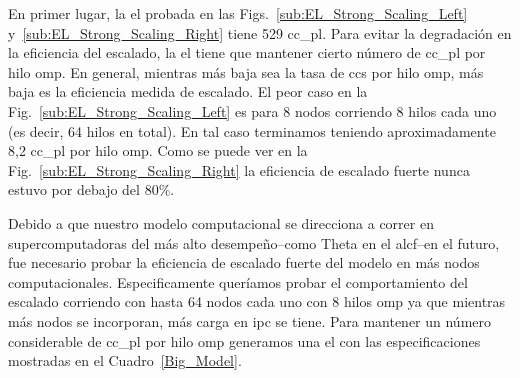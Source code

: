 {En primer lugar, la \gls{el} probada en las Figs.~\ref{sub:EL_Strong_Scaling_Left} y~\ref{sub:EL_Strong_Scaling_Right} tiene 529 \gls{cc_pl}.
Para evitar la degradación en la eficiencia del escalado, la \gls{el} tiene que mantener cierto número de \gls{cc_pl} por hilo \gls{omp}.
En general, mientras más baja sea la tasa de \glspl{cc} por hilo \gls{omp}, más baja es la eficiencia medida de escalado.
El peor caso en la Fig.~\ref{sub:EL_Strong_Scaling_Left} es para 8 nodos corriendo 8 hilos cada uno (es decir, 64 hilos en total).
En tal caso terminamos teniendo aproximadamente 8,2 \gls{cc_pl} por hilo \gls{omp}.
Como se puede ver en la Fig.~\ref{sub:EL_Strong_Scaling_Right} la eficiencia de escalado fuerte nunca estuvo por debajo del 80\%.

Debido a que nuestro modelo computacional se direcciona a correr en supercomputadoras del más alto desempeño--como Theta en el \gls{alcf}--en el futuro, fue necesario probar la eficiencia de escalado fuerte del modelo en más nodos computacionales.
Especificamente queríamos probar el comportamiento del escalado corriendo con hasta 64 nodos cada uno con 8 hilos \gls{omp} ya que mientras más nodos se incorporan, más carga en \gls{ipc} se tiene.
Para mantener un número considerable de \gls{cc_pl} por  hilo \gls{omp} generamos una \gls{el} con las especificaciones mostradas en el Cuadro~\ref{Big_Model}.

}
